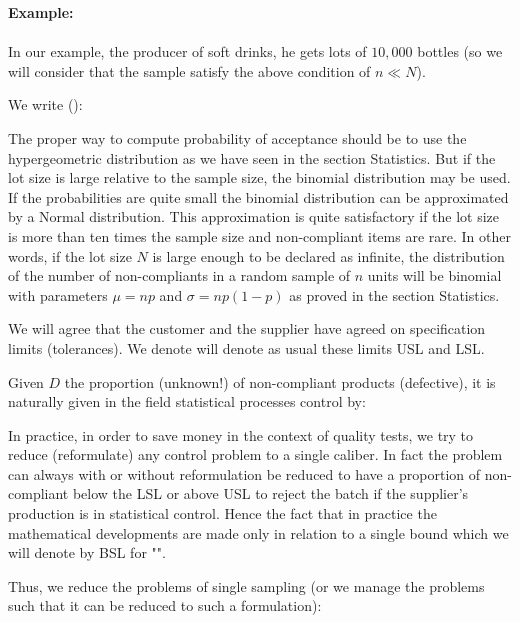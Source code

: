 	\begin{tcolorbox}[colframe=black,colback=white,sharp corners]
	\textbf{{\Large {}}Example:}\\\\
	In our example, the producer of soft drinks, he gets lots of $10,000$ bottles (so we will consider that the sample satisfy the above condition of $n \ll N$).
	\end{tcolorbox}
	We write ():
	
	\begin{tcolorbox}[title=Remark,colframe=black,arc=10pt]
	The proper way to compute probability of acceptance should be to use the hypergeometric distribution as we have seen in the section Statistics. But if the lot size is large relative to the sample size, the binomial distribution may be used. If the probabilities are quite small the binomial distribution can be approximated by a Normal distribution. This approximation is quite satisfactory if the lot size is more than ten times the sample size and non-compliant items are rare. In other words, if the lot size $N$ is large enough to be declared as infinite, the distribution of the number of non-compliants in a random sample of $n$ units will be binomial with parameters $\mu=np$ and $\sigma=np(1-p)$ as proved in the section Statistics.
	\end{tcolorbox}
	We will agree that the customer and the supplier have agreed on specification limits (tolerances). We denote will denote as usual these limits USL and LSL.

	Given $D$ the proportion (unknown!) of non-compliant products (defective), it is naturally given in the field statistical processes control by:
	
	In practice, in order to save money in the context of quality tests, we try to reduce (reformulate) any control problem to a single caliber. In fact the problem can always with or without reformulation be reduced to have a proportion of non-compliant below the LSL or above USL to reject the batch if the supplier's production is in statistical control. Hence the fact that in practice the mathematical developments are made only in relation to a single bound which we will denote by BSL for "".

	Thus, we reduce the problems of single sampling (or we manage the problems such that it can be reduced to such a formulation):
	
